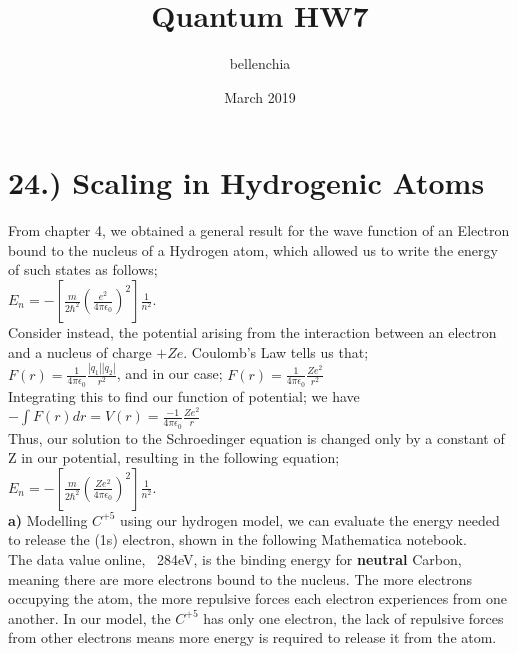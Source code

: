 \documentclass[10pt]{article}
\title{Quantum HW7}
\author{bellenchia}
\date{March 2019}
\begin{document}
\maketitle
\section*{24.) Scaling in Hydrogenic Atoms}

From chapter 4, we obtained a general result for the wave function of an Electron bound to the nucleus of a Hydrogen atom, which allowed us to write the energy of such states as follows;\\
$E_n=-[\frac{m}{2\hbar^2}(\frac{e^2}{4\pi\epsilon_0})^2]\frac{1}{n^2}.$\\

Consider instead, the potential arising from the interaction between an electron and a nucleus of charge $+Ze$. Coulomb's Law tells us that;\\

$F(r)=\frac{1}{4\pi\epsilon_0}\frac{|q_1||q_2|}{r^2}$, and in our case; $F(r)=\frac{1}{4\pi\epsilon_0}\frac{Ze^2}{r^2}$\\

Integrating this to find our function of potential; we have $-{\displaystyle\int}F(r)dr=V(r)=\frac{-1}{4\pi\epsilon_0}\frac{Ze^2}{r}$\\

Thus, our solution to the Schroedinger equation is changed only by a constant of Z in our potential, resulting in the following equation;\\ $E_n=-[\frac{m}{2\hbar^2}(\frac{Ze^2}{4\pi\epsilon_0})^2]\frac{1}{n^2}$.\\

\textbf{a) } Modelling $C^{+5}$ using our hydrogen model, we can evaluate the energy needed to release the (1s) electron, shown in the following Mathematica notebook.\\
The data value online, ~284eV, is the binding energy for \textbf{neutral} Carbon, meaning there are more electrons bound to the nucleus. The more electrons occupying the atom, the more repulsive forces each electron experiences from one another. In our model, the $C^{+5}$ has only one electron, the lack of repulsive forces from other electrons means more energy is required to release it from the atom.\\
\end{document}

